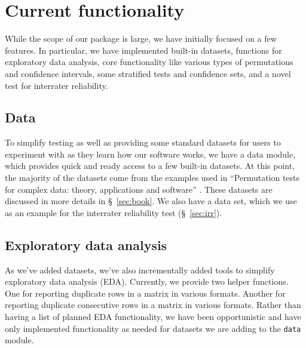 \chapter{\label{ch:func}Current functionality}

While the scope of our package is large, we have initially focused on a
few features.  In particular, we have implemented built-in datasets,
functions for exploratory data analysis, core functionality like various
types of permutations and confidence intervals, some stratified tests
and confidence sets, and a novel test for interrater reliability.

\section{Data}

To simplify testing as well as providing some standard datasets for
users to experiment with as they learn how our software works, we
have a data module, which provides quick and ready access to a few
built-in datasets. At this point, the majority of the datasets come
from the examples used in ``Permutation tests for complex data: theory,
applications and software'' \cite{pesarin2010permutation}.  These
datasets are discussed in more details in \S~\ref{sec:book}.  We also
have a data set, which we use as an example for the interrater
reliability test (\S~\ref{sec:irr}).

%

\section{Exploratory data analysis}

As we've added datasets, we've also incrementally added tools to simplify
exploratory data analysis (EDA).  Currently, we provide two helper functions.
One for reporting duplicate rows in a matrix in various formats.  Another for
reporting duplicate consecutive rows in a matrix in various formats.  Rather
than having a list of planned EDA functionality, we have been opportunistic
and have only implemented functionality as needed for datasets we are adding
to the \texttt{data} module.

